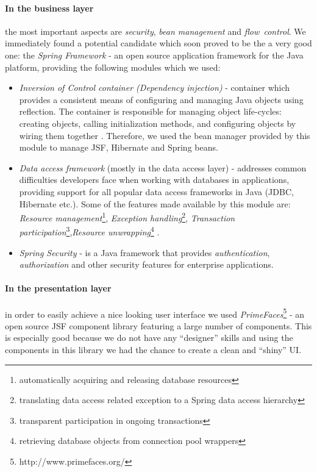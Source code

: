 \paragraph{In the business layer} the most important aspects are
\emph{security}, \emph{bean management} and \emph{flow~control}. We
immediately found a potential candidate which soon proved to be the a very good
one: the \emph{Spring Framework} - an open source application framework for the
Java platform, providing the following modules which we used:
\begin{itemize}
  \item \emph{Inversion of Control container (Dependency injection)} -
  container which provides a consistent means of configuring and managing Java
  objects using reflection. The container is responsible for managing
  object life-cycles: creating objects, calling initialization methods, and
  configuring objects by wiring them together \cite{wiki_spring}. Therefore, we
  used the bean manager provided by this module to manage JSF, Hibernate and
  Spring beans.
  \item \emph{Data access framework} (mostly in the data access layer) -
  addresses common difficulties developers face when working with databases in applications, providing support for all
  popular data access frameworks in Java (JDBC, Hibernate etc.). Some of the
  features made available by this module are: \emph{Resource
  management}\footnote{automatically acquiring and releasing database
  resources}, \emph{Exception handling}\footnote{translating data access related
  exception to a Spring data access hierarchy}, \emph{Transaction
  participation}\footnote{transparent participation in ongoing
  transactions},\emph{Resource unwrapping}\footnote{retrieving database objects
  from connection pool wrappers} \cite{wiki_spring}.
  \item \emph{Spring Security} - is a Java framework that provides
  \emph{authentication}, \emph{authorization} and other security features for
  enterprise applications.
\end{itemize}

\paragraph{In the presentation layer} in order to easily achieve a nice looking
user interface we used \emph{PrimeFaces}\footnote{http://www.primefaces.org/} - an open source
JSF component library featuring a large number of components. This is especially
good because we do not have any ``designer'' skills and using the components in
this library we had the chance to create a clean and ``shiny'' UI.\\

